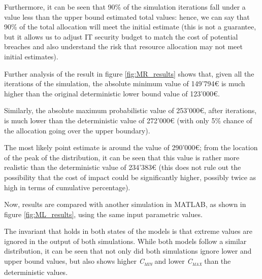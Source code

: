 Furthermore, it can be seen that 90\% of the simulation iterations fall under a value less than the upper bound estimated total values: hence, we can say that 90\% of the total allocation will meet the initial estimate (this is not a guarantee, but it allows us to adjust IT security budget to match the cost of potential breaches and also understand the risk that resource allocation may not meet initial estimates).

Further analysis of the result in figure \ref{fig:MR_results} shows that, given all the iterations of the simulation, the absolute minimum value of 149'794€ is much higher than the original deterministic lower bound value of 123'000€.

Similarly, the absolute maximum probabilistic value of 253'000€, after iterations, is much lower than the deterministic value of 272'000€ (with only 5\% chance of the allocation going over the upper boundary). 

The most likely point estimate is around the value of 290'000€; from the location of the peak of the distribution, it can be seen that this value is rather more realistic than the deterministic value of 234'383€ (this does not rule out the possibility that the cost of impact could be significantly higher, possibly twice as high in terms of cumulative percentage). 

Now, results are compared with another simulation in MATLAB, as shown in figure \ref{fig:ML_results}, using the same input parametric values.

The invariant that holds in both states of the models is that extreme values are ignored in the output of both simulations.
While both models follow a similar distribution, it can be seen that not only did both simulations ignore lower and upper bound values, but also shows higher \textsc{\textit{C\textsubscript{min}}} and lower \textsc{\textit{C\textsubscript{max}}} than the 
deterministic values.
